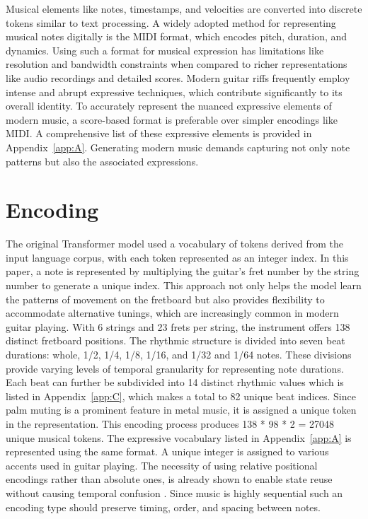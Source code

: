 \documentclass[twoside,11pt]{article}
\begin{document}
Musical elements like notes, timestamps, and velocities are converted into discrete tokens similar to 
text processing. \cite{aws_deepcomposer} A widely adopted method for representing musical notes digitally is the MIDI format, 
which encodes pitch, duration, and dynamics. Using such a format for musical expression has limitations like resolution 
and bandwidth constraints \cite{midi_short} when compared to richer representations like 
audio recordings and detailed scores. Modern guitar riffs frequently employ intense and abrupt expressive
techniques, which contribute significantly to its overall identity. To accurately represent the nuanced 
expressive elements of modern music, a score-based format is preferable over simpler encodings like MIDI.
A comprehensive list of these expressive elements is provided in Appendix~\ref{app:A}. Generating modern music 
demands capturing not only note patterns but also the associated expressions. 

\section{Encoding}
The original Transformer model \cite{Vaswani} used a vocabulary of tokens derived from the input language corpus, with each token 
represented as an integer index. In this paper, a note is represented by multiplying the guitar's fret number by the string number to 
generate a unique index. This approach not only helps the model learn the patterns of movement on the fretboard 
but also provides flexibility to accommodate alternative tunings, which are increasingly common in modern guitar playing.
With 6 strings and 23 frets per string, the instrument offers 138 distinct fretboard positions. The rhythmic structure is 
divided into seven beat durations: whole, 1/2, 1/4, 1/8, 1/16, and 1/32 and 1/64 notes. 
These divisions provide varying levels of temporal granularity for representing note durations. Each beat can further be 
subdivided into 14 distinct rhythmic values which is listed in Appendix~\ref{app:C}, which makes a total to 82 unique beat indices.
Since palm muting is a prominent feature in metal music, 
it is assigned a unique token in the representation. This encoding process produces 138 * 98 * 2 = 27048 unique musical tokens. 
The expressive vocabulary listed in Appendix~\ref{app:A} is represented using the same format. A unique integer is assigned to various accents used in guitar playing.
The necessity of using relative positional encodings rather than absolute ones, is already shown to enable state reuse without causing temporal confusion \cite{XL}. 
Since music is highly sequential such an encoding type should preserve timing, order, and spacing between notes.
\end{document}
